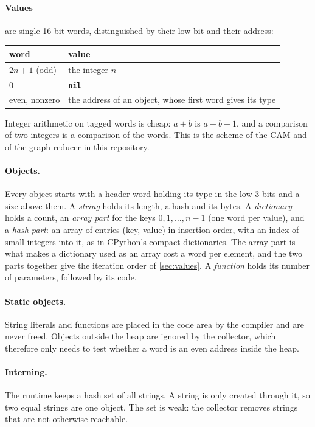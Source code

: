 \documentclass[11pt,a4paper]{article}
\newcommand{\kw}[1]{\textbf{\texttt{#1}}}
\begin{document}
\paragraph{Values} are single 16-bit words, distinguished by their low bit
and their address:
\begin{center}
\small
\begin{tabular}{@{}l l@{}}
\toprule
word & value\\
\midrule
$2n+1$ (odd) & the integer $n$\\
0 & \kw{nil}\\
even, nonzero & the address of an object, whose first word gives its type\\
\bottomrule
\end{tabular}
\end{center}
Integer arithmetic on tagged words is cheap: $a+b$ is $a+b-1$, and a
comparison of two integers is a comparison of the words. This is the scheme
of the CAM and of the graph reducer in this repository.

\paragraph{Objects.} Every object starts with a header word holding its type
in the low 3 bits and a size above them. A \emph{string} holds its length,
a hash and its bytes. A \emph{dictionary} holds a count, an \emph{array part}
for the keys $0, 1, \ldots, n-1$ (one word per value), and a \emph{hash
part}: an array of entries (key, value) in insertion order, with an index of
small integers into it, as in CPython's compact dictionaries. The array part
is what makes a dictionary used as an array cost a word per element, and the
two parts together give the iteration order of \cref{sec:values}. A
\emph{function} holds its number of parameters, followed by its code.

\paragraph{Static objects.} String literals and functions are placed in the
code area by the compiler and are never freed. Objects outside the heap are
ignored by the collector, which therefore only needs to test whether a word
is an even address inside the heap.

\paragraph{Interning.} The runtime keeps a hash set of all strings. A
string is only created through it, so two equal strings are one object. The
set is weak: the collector removes strings that are not otherwise reachable.
\end{document}

